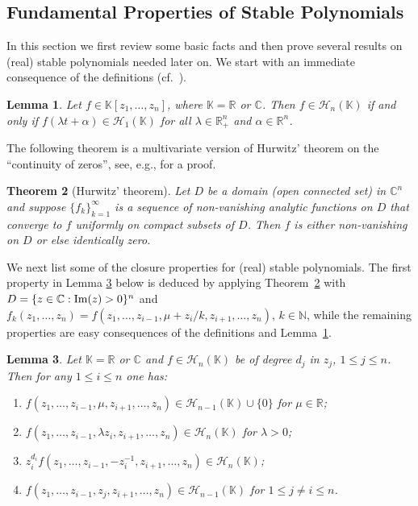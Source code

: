\documentclass[10pt,reqno]{amsart}
\theoremstyle{plain}
\newtheorem{theorem}{Theorem}[section]
\newtheorem{lemma}[theorem]{Lemma}
\theoremstyle{definition}
\theoremstyle{remark}
\numberwithin{equation}{section}
\newcommand{\NN}{\mathbb{N}}
\newcommand{\HH}{\mathcal{H}}
\newcommand{\RR}{\mathbb{R}}
\newcommand{\CC}{\mathbb{C}}
\newcommand{\KK}{\mathbb{K}}
\renewcommand{\Im}{{\rm Im}}
\begin{document}
\subsection{Fundamental Properties of Stable Polynomials}\label{s-2}

In this section we first review some basic facts and then prove several 
results on (real) stable polynomials needed later on.
We start with an immediate consequence of the definitions 
(cf.~\cite[Lemma 2.1]{BBS3}).

\begin{lemma}\label{l-obv}
Let $f\in\KK[z_1,\ldots,z_n]$, where $\KK=\RR$ or $\CC$. Then $f\in\HH_n(\KK)$
if and only if $f(\lambda t+\alpha)\in\HH_1(\KK)$ for all $\lambda\in\RR_+^n$
and $\alpha\in\RR^n$.
\end{lemma}

The following theorem is a multivariate version of Hurwitz' theorem on the 
``continuity of zeros'', see, e.g., \cite[Footnote 3, p.~96]{COSW} for a
proof.

\begin{theorem}[Hurwitz' theorem]\label{mult-hur}
Let $D$ be a domain (open connected set) in $\CC^n$ and suppose 
$\{f_k\}_{k=1}^\infty$ is a sequence of non-vanishing 
analytic functions on $D$ that converge to $f$ uniformly on compact 
subsets of $D$. Then $f$ is either 
non-vanishing on $D$ or else identically zero. 
\end{theorem}

We next list some of the closure properties for (real) stable polynomials. 
The first property in Lemma \ref{l-close} below is deduced by applying 
Theorem~\ref{mult-hur} with
$D= \{z \in \CC : \Im(z)>0\}^n$ and $f_k(z_1,\ldots,z_n)
= f(z_1, \ldots, z_{i-1}, \mu+z_i/k, z_{i+1}, \ldots, z_n)$, $k\in\NN$, while
the remaining properties are easy consequences of the definitions and 
Lemma~\ref{l-obv}.

\begin{lemma}\label{l-close}
Let $\KK=\RR$ or $\CC$ and $f\in\HH_n(\KK)$ be of degree  $d_j$ in $z_j$, 
$1\le j\le n$. Then for any $1\le i\le n$ one has:
\begin{enumerate} 
\item $f(z_1,\ldots,z_{i-1},\mu,z_{i+1},\ldots,z_n) 
\in \HH_{n-1}(\KK)\cup\{0\}$ for $\mu\in \RR$;
\item $f(z_1,\ldots,z_{i-1},\lambda z_i,z_{i+1},\ldots,z_n) 
\in \HH_{n}(\KK)$ for $\lambda>0$;
\item $z_i^{d_i}f(z_1,\ldots,z_{i-1},-z_i^{-1},z_{i+1},\ldots,z_n)\in 
\HH_{n}(\KK)$;
\item $f(z_1,\ldots,z_{i-1},z_j, z_{i+1},\ldots,z_n)\in \HH_{n-1}(\KK)$ for 
$1\le j\neq i\le n$.
\end{enumerate} 
\end{lemma}
\end{document}
